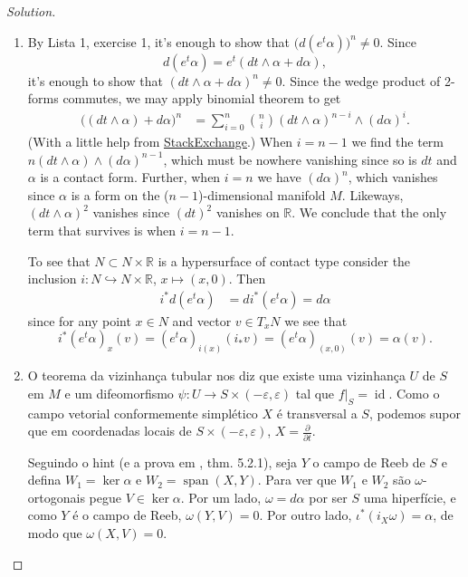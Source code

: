 \begin{proof}[Solution]\leavevmode
\begin{enumerate}[label=(\alph*)]
\item   By Lista 1, exercise 1, it's enough to show that $\Big(d(e^t\alpha)\Big)^n\neq 0$. Since 
	\[d(e^t\alpha)=e^t(dt\wedge \alpha+d\alpha),\] 
	it's enough to show that $(dt \wedge \alpha+d\alpha)^n \neq 0$. Since the wedge product of 2-forms commutes, we may apply binomial theorem to get
	\begin{align*}
		\Big((dt\wedge \alpha)+ d\alpha\Big)^n&=\sum_{i=0}^n\binom{n}{i}(dt \wedge \alpha)^{n-i}\wedge (d\alpha)^i.
	\end{align*}
	(With a little help from \href{https://math.stackexchange.com/questions/3552761/given-a-contact-manifold-give-a-contact-form-on-m-%C3%97-mathbb-r2}{StackExchange}.) When $i=n-1$ we find the term $n(dt \wedge \alpha)\wedge(d\alpha)^{n-1}$, which must be nowhere vanishing since so is $dt$ and $\alpha$ is a contact form. Further, when $i=n$ we have  $(d \alpha)^n$, which vanishes since $\alpha$ is a form on the ($n-1$)-dimensional manifold  $M$. Likeways, $(dt \wedge \alpha)^2$ vanishes since $(dt)^2$ vanishes on $\mathbb{R}$. We conclude that the only term that survives is when $i=n-1$.

	 To see that $N \subset N \times \mathbb{R}$ is a hypersurface of contact type consider the inclusion $i:N \hookrightarrow  N \times \mathbb{R}$, $x\mapsto (x,0)$. Then
\begin{align*}
i^* d (e^t\alpha)&=d i^*(e^t\alpha)=d\alpha
\end{align*}
since for any point $x \in N$ and vector $v \in T_xN$ we see that
\[i^*(e^t\alpha)_x(v)=(e^t\alpha)_{i(x)}(i_*v)=(e^t\alpha)_{(x,0)}(v)=\alpha(v).\]
 \item O teorema da vizinhança tubular nos diz que existe uma vizinhança $U$ de $S$ em $M$ e um difeomorfismo $\psi:U \to S \times (-\varepsilon,\varepsilon)$ tal que $f|_{S}=\operatorname{id}$. Como o campo vetorial conformemente simplético $X$ é transversal a $S$, podemos supor que em coordenadas locais de $S \times (-\varepsilon,\varepsilon)$, $X=\frac{\partial }{\partial t}$.

Seguindo o hint (e a prova em \cite{sg}, thm. 5.2.1), seja $Y$ o campo de Reeb de $S$ e defina $W_1=\ker \alpha$ e $W_2=\operatorname{span}(X,Y)$. Para ver que  $W_1$ e $W_2$ são $\omega$-ortogonais pegue $V \in \ker \alpha$. Por um lado, $\omega=d\alpha$ por ser $S$ uma hiperfície, e como $Y$ é o campo de Reeb, $\omega(Y,V)=0$. Por outro lado, $ \iota^*(i_X \omega)=\alpha$, de modo que $\omega(X,V)=0$.


\end{enumerate}
\end{proof}
